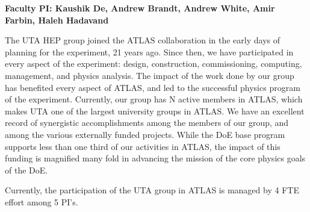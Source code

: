 
\textbf{Faculty PI: Kaushik De, Andrew Brandt, Andrew White, Amir Farbin, Haleh Hadavand}

The UTA HEP group joined the ATLAS collaboration in the early days of planning for the experiment, 21 years ago. Since then, we have participated in every aspect of the experiment: design, construction, commissioning, computing, management, and physics analysis. 
The impact of the work done by our group has benefited every aspect of ATLAS, and led to the successful physics program of the experiment. 
Currently, our group has N active members in ATLAS, which makes UTA one of the largest university groups in ATLAS. We have an excellent record of synergistic accomplishments 
among the members of our group, and among the various externally funded projects. While the DoE base program supports less than one third of our activities in ATLAS, the impact of 
this funding is magnified many fold in advancing the mission of the core physics goals of the DoE.

Currently, the participation of the UTA group in ATLAS is managed by 4 FTE effort among 5 PI's. 